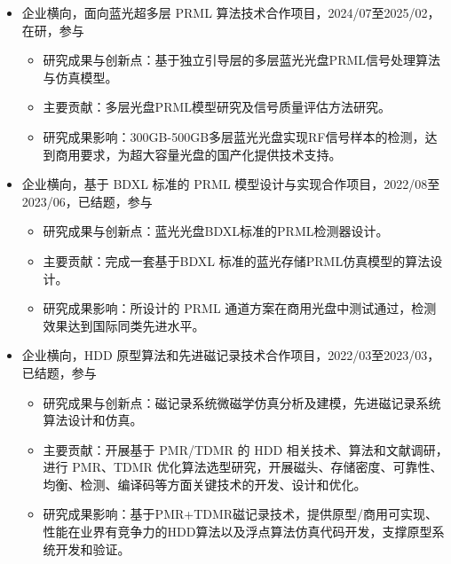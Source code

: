 \documentclass[zh]{resume}
\begin{document}
\begin{itemize}
  \item 企业横向，面向蓝光超多层 PRML 算法技术合作项目，2024/07至2025/02，在研，参与
  \begin{itemize}
    \item 研究成果与创新点：基于独立引导层的多层蓝光光盘PRML信号处理算法与仿真模型。
    \item 主要贡献：多层光盘PRML模型研究及信号质量评估方法研究。
    \item 研究成果影响：300GB-500GB多层蓝光光盘实现RF信号样本的检测，达到商用要求，为超大容量光盘的国产化提供技术支持。
    \end{itemize}

  \item 企业横向，基于 BDXL 标准的 PRML 模型设计与实现合作项目，2022/08至2023/06，已结题，参与
  \begin{itemize}
    \item 研究成果与创新点：蓝光光盘BDXL标准的PRML检测器设计。
    \item 主要贡献：完成一套基于BDXL 标准的蓝光存储PRML仿真模型的算法设计。
    \item 研究成果影响：所设计的 PRML 通道方案在商用光盘中测试通过，检测效果达到国际同类先进水平。
  \end{itemize}

  \item 企业横向，HDD 原型算法和先进磁记录技术合作项目，2022/03至2023/03，已结题，参与
  \begin{itemize}
    \item 研究成果与创新点：磁记录系统微磁学仿真分析及建模，先进磁记录系统算法设计和仿真。
    \item 主要贡献：开展基于 PMR/TDMR 的 HDD 相关技术、算法和文献调研，进行 PMR、TDMR 优化算法选型研究，开展磁头、存储密度、可靠性、均衡、检测、编译码等方面关键技术的开发、设计和优化。
    \item 研究成果影响：基于PMR+TDMR磁记录技术，提供原型/商用可实现、性能在业界有竞争力的HDD算法以及浮点算法仿真代码开发，支撑原型系统开发和验证。
  \end{itemize}
\end{itemize}
\end{document}
